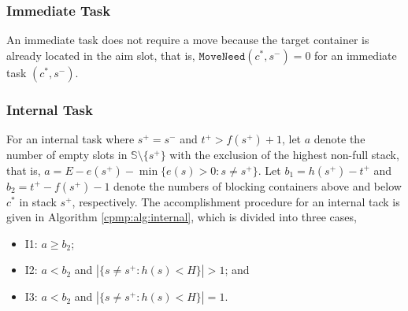 \documentclass{article}
\begin{document}
\subsubsection{Immediate Task}

An immediate task does not require a move because the target container is already located in the aim slot, that is, $\mathtt{MoveNeed}(c^*,s^-)=0$ for an immediate task $(c^*,s^-)$.

\subsubsection{Internal Task}

For an internal task where $s^+=s^-$ and $t^+>f(s^+)+1$, let $a$ denote the number of empty slots in $\mathbb{S}\setminus\{s^+\}$ with the exclusion of the highest non-full stack, that is, $a=E-e(s^+)-\min\{e(s)>0: s\neq s^+\}$.  Let $b_1=h(s^+)-t^+$ and $b_2=t^+-f(s^+)-1$ denote the numbers of blocking containers above and below $c^*$ in stack $s^+$, respectively. The accomplishment procedure for an internal tack is given in  Algorithm \ref{cpmp:alg:internal}, which is divided into three cases,
\begin{itemize}[nosep]
\item I1: $a\ge b_2$;
\item I2: $a<b_2$ and $|\{s\neq s^+: h(s)<H\}|>1$; and
\item I3: $a<b_2$ and $|\{s\neq s^+: h(s)<H\}|=1$.
\end{itemize}
\end{document}
